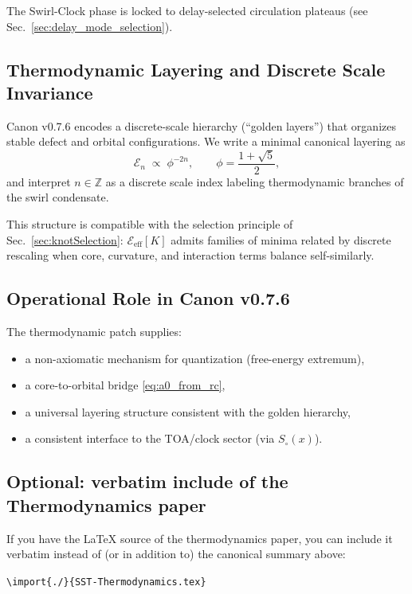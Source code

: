 \documentclass[10pt]{article}
\newcommand{\swirlfactor}{S_\circ(x)}
\begin{document}
The Swirl-Clock phase is locked to delay-selected circulation plateaus (see Sec.~\ref{sec:delay_mode_selection}).

\subsection{Thermodynamic Layering and Discrete Scale Invariance}

Canon v0.7.6 encodes a discrete-scale hierarchy (``golden layers'') that
organizes stable defect and orbital configurations. We write a minimal
canonical layering as
\begin{equation}
    \mathcal{E}_n \;\propto\; \phi^{-2n},
    \qquad
    \phi=\frac{1+\sqrt{5}}{2},
\end{equation}
and interpret $n\in\mathbb{Z}$ as a discrete scale index labeling
thermodynamic branches of the swirl condensate.

This structure is compatible with the selection principle of
Sec.~\ref{sec:knotSelection}: $\mathcal{E}_{\mathrm{eff}}[K]$ admits families
of minima related by discrete rescaling when core, curvature, and interaction
terms balance self-similarly.

\subsection{Operational Role in Canon v0.7.6}

The thermodynamic patch supplies:
\begin{itemize}
    \item a non-axiomatic mechanism for quantization (free-energy extremum),
    \item a core-to-orbital bridge \eqref{eq:a0_from_rc},
    \item a universal layering structure consistent with the golden hierarchy,
    \item a consistent interface to the TOA/clock sector (via $\swirlfactor$).
\end{itemize}

\subsection{Optional: verbatim include of the Thermodynamics paper}

If you have the LaTeX source of the thermodynamics paper, you can include it
verbatim instead of (or in addition to) the canonical summary above:
\begin{center}
\texttt{\textbackslash import\{./\}\{SST-Thermodynamics.tex\}}
\end{center}
\end{document}
